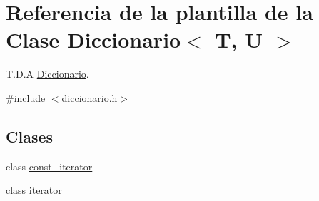 \hypertarget{classDiccionario}{}\section{Referencia de la plantilla de la Clase Diccionario$<$ T, U $>$}
\label{classDiccionario}


T.\+D.\+A \hyperlink{classDiccionario}{Diccionario}.  




{\ttfamily \#include $<$diccionario.\+h$>$}

\subsection*{Clases}
\begin{DoxyCompactItemize}
\item 
class \hyperlink{classDiccionario_1_1const__iterator}{const\+\_\+iterator}
\item 
class \hyperlink{classDiccionario_1_1iterator}{iterator}
\end{DoxyCompactItemize}
